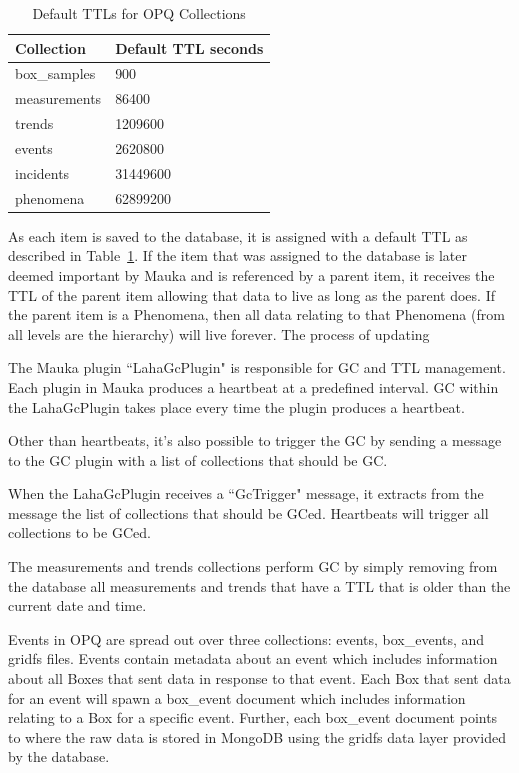 \begin{table}[H]
    \centering
    \caption{Default TTLs for OPQ Collections}
    \begin{tabularx}{\textwidth}{XX}
        \toprule
        \textbf{Collection} & \textbf{Default TTL seconds} \\
        \midrule
        box\_samples & 900 \\
        measurements & 86400 \\
        trends & 1209600 \\
        events & 2620800 \\
        incidents & 31449600 \\
        phenomena & 62899200 \\
        \bottomrule
    \end{tabularx}
    \label{table:DefaultTtls}
\end{table}

As each item is saved to the database, it is assigned with a default TTL as described in Table~\ref{table:DefaultTtls}. If the item that was assigned to the database is later deemed important by Mauka and is referenced by a parent item, it receives the TTL of the parent item allowing that data to live as long as the parent does. If the parent item is a Phenomena, then all data relating to that Phenomena (from all levels are the hierarchy) will live forever. The process of updating

The Mauka plugin ``LahaGcPlugin" is responsible for GC and TTL management. Each plugin in Mauka produces a heartbeat at a predefined interval. GC within the LahaGcPlugin takes place every time the plugin produces a heartbeat.

Other than heartbeats, it's also possible to trigger the GC by sending a message to the GC plugin with a list of collections that should be GC\@.

When the LahaGcPlugin receives a ``GcTrigger" message, it extracts from the message the list of collections that should be GCed. Heartbeats will trigger all collections to be GCed.

The measurements and trends collections perform GC by simply removing from the database all measurements and trends that have a TTL that is older than the current date and time.

Events in OPQ are spread out over three collections: events, box\_events, and gridfs files. Events contain metadata about an event which includes information about all Boxes that sent data in response to that event. Each Box that sent data for an event will spawn a box\_event document which includes information relating to a Box for a specific event. Further, each box\_event document points to where the raw data is stored in MongoDB using the gridfs data layer provided by the database.

